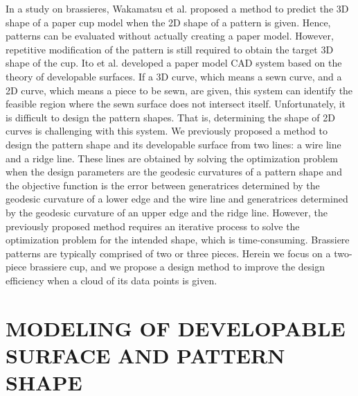 \documentclass[E]{scitrans}
\begin{document}
In a study on brassieres, Wakamatsu et al. proposed a method to predict the 3D shape of a paper cup model when the 2D shape of a pattern is given\cite{c10,c11}. Hence, patterns can be evaluated without actually creating a paper model. However, repetitive modification of the pattern is still required to obtain the target 3D shape of the cup. Ito et al. developed a paper model CAD system based on the theory of developable surfaces\cite{c12}. If a 3D curve, which means a sewn curve, and a 2D curve, which means a piece to be sewn, are given, this system can identify the feasible region where the sewn surface does not intersect itself. Unfortunately, it is difficult to design the pattern shapes. That is, determining the shape of 2D curves is challenging with this system. 
We previously proposed a method to design the pattern shape and its developable surface from two lines: a wire line and a ridge line. These lines are obtained by solving the optimization problem when the design parameters are the geodesic curvatures of a pattern shape and the objective function is the error between generatrices determined by the geodesic curvature of a lower edge and the wire line and generatrices determined by the geodesic curvature of an upper edge and the ridge line. However, the previously proposed method requires an iterative process to solve the optimization problem for the intended shape\cite{MyRef,MyRef2}, which is time-consuming.
Brassiere patterns are typically comprised of two or three pieces. Herein we focus on a two-piece brassiere cup, and we propose a design method to improve the design efficiency when a cloud of its data points is given. 

\section*{MODELING OF DEVELOPABLE SURFACE AND PATTERN SHAPE}
\end{document}
